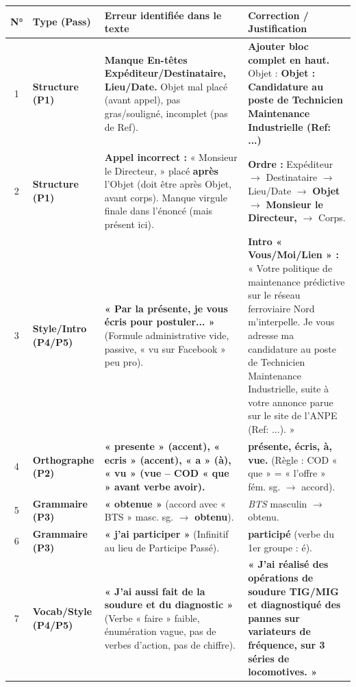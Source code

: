 \documentclass[11pt]{article}
\begin{document}
\begin{exoresolu}
\begin{center}
\begin{tabularx}{\linewidth}{|c|l|X|X|}\hline
\textbf{N°} & \textbf{Type (Pass)} & \textbf{Erreur identifiée dans le texte} & \textbf{Correction / Justification} \\ \hline
1 & \textbf{Structure (P1)} & \textbf{Manque En-têtes Expéditeur/Destinataire, Lieu/Date.} Objet mal placé (avant appel), pas gras/souligné, incomplet (pas de Ref). & \textbf{Ajouter bloc complet en haut.} Objet : \textbf{Objet : Candidature au poste de Technicien Maintenance Industrielle (Ref: ...)} \\ \hline
2 & \textbf{Structure (P1)} & \textbf{Appel incorrect :} « Monsieur le Directeur, » placé \textbf{après} l'Objet (doit être après Objet, avant corps). Manque virgule finale dans l'énoncé (mais présent ici). & \textbf{Ordre :} Expéditeur $\rightarrow$ Destinataire $\rightarrow$ Lieu/Date $\rightarrow$ \textbf{Objet} $\rightarrow$ \textbf{Monsieur le Directeur,} $\rightarrow$ Corps. \\ \hline
3 & \textbf{Style/Intro (P4/P5)} & \textbf{« Par la présente, je vous écris pour postuler... »} (Formule administrative vide, passive, « vu sur Facebook » peu pro). & \textbf{Intro « Vous/Moi/Lien » :} « Votre politique de maintenance prédictive sur le réseau ferroviaire Nord m'interpelle. Je vous adresse ma candidature au poste de Technicien Maintenance Industrielle, suite à votre annonce parue sur le site de l'ANPE (Ref: ...). » \\ \hline
4 & \textbf{Orthographe (P2)} & \textbf{« presente » (accent), « ecris » (accent), « a » (à), « vu » (vue -- COD « que » avant verbe avoir).} & \textbf{présente, écris, à, vue.} (Règle : COD « que » = « l'offre » fém. sg. $\rightarrow$ accord). \\ \hline
5 & \textbf{Grammaire (P3)} & \textbf{« obtenue »} (accord avec « BTS » masc. sg. $\rightarrow$ \textbf{obtenu}). & \textit{BTS} masculin $\rightarrow$ obtenu. \\ \hline
6 & \textbf{Grammaire (P3)} & \textbf{« j'ai participer »} (Infinitif au lieu de Participe Passé). & \textbf{participé} (verbe du 1er groupe : é). \\ \hline
7 & \textbf{Vocab/Style (P4/P5)} & \textbf{« J'ai aussi fait de la soudure et du diagnostic »} (Verbe « faire » faible, énumération vague, pas de verbes d'action, pas de chiffre). & \textbf{« J'ai \textbf{réalisé} des opérations de \textbf{soudure TIG/MIG} et \textbf{diagnostiqué} des pannes sur variateurs de fréquence, sur 3 séries de locomotives. »} \\ \hline

\end{tabularx}
\end{center}
\end{exoresolu}
\end{document}
